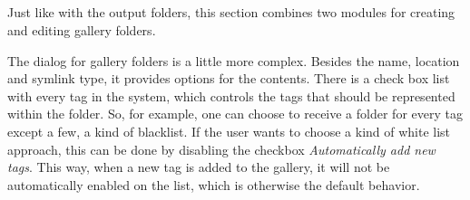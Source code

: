 \subsection{}
\def\kapitelautor{Erik Ritschl}

Just like with the output folders, this section combines two modules for creating and editing gallery folders.

The dialog for gallery folders is a little more complex. Besides the name, location and symlink type, it provides options for the contents. There is a check box list with every tag in the system, which controls the tags that should be represented within the folder. So, for example, one can choose to receive a folder for every tag except a few, a kind of blacklist. If the user wants to choose a kind of white list approach, this can be done by disabling the checkbox \emph{Automatically add new tags}. This way, when a new tag is added to the gallery, it will not be automatically enabled on the list, which is otherwise the default behavior.